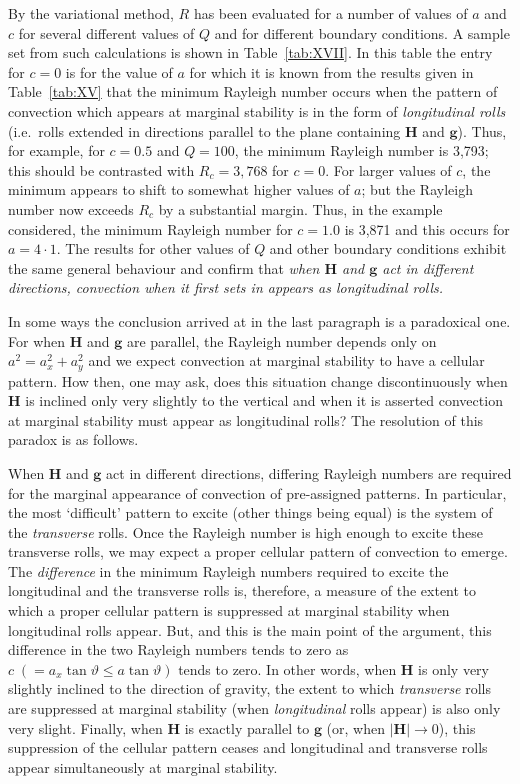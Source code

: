 By the variational method, $R$ has been evaluated for a number of values of $a$ and $c$ for several different values of $Q$ and for different boundary conditions. A sample set from such calculations is shown in Table~\ref{tab:XVII}. In this table the entry for $c=0$ is for the value of $a$ for which it is known from the results given in Table~\ref{tab:XV} that the minimum Rayleigh number occurs when the pattern of convection which appears at marginal stability is in the form of \emph{longitudinal rolls} (i.e.\ rolls extended in directions parallel to the plane containing $\mathbf{H}$ and $\mathbf{g}$). Thus, for example, for $c=0.5$ and $Q=100$, the minimum Rayleigh number is 3,793; this should be contrasted with $R_c=3{,}768$ for $c=0$. For larger values of $c$, the minimum appears to shift to somewhat higher values of $a$; but the Rayleigh number now exceeds $R_c$ by a substantial margin. Thus, in the example considered, the minimum Rayleigh number for $c=1.0$ is 3,871 and this occurs for $a=4{\cdot}1$. The results for other values of $Q$ and other boundary conditions exhibit the same general behaviour and confirm that \emph{when $\mathbf{H}$ and $\mathbf{g}$ act in different directions, convection when it first sets in appears as longitudinal rolls.}

In some ways the conclusion arrived at in the last paragraph is a paradoxical one. For when $\mathbf{H}$ and $\mathbf{g}$ are parallel, the Rayleigh number depends only on $a^2=a_x^2+a_y^2$ and we expect convection at marginal stability to have a cellular pattern. How then, one may ask, does this situation change discontinuously when $\mathbf{H}$ is inclined only very slightly to the vertical and when it is asserted convection at marginal stability must appear as longitudinal rolls? The resolution of this paradox is as follows.

When $\mathbf{H}$ and $\mathbf{g}$ act in different directions, differing Rayleigh numbers are required for the marginal appearance of convection of pre-assigned patterns. In particular, the most `difficult' pattern to excite (other things being equal) is the system of the \emph{transverse} rolls. Once the Rayleigh number is high enough to excite these transverse rolls, we may expect a proper cellular pattern of convection to emerge. The \emph{difference} in the minimum Rayleigh numbers required to excite the longitudinal and the transverse rolls is, therefore, a measure of the extent to which a proper cellular pattern is suppressed at marginal stability when longitudinal rolls appear. But, and this is the main point of the argument, this difference in the two Rayleigh numbers tends to zero as $c\;(=a_x\tan\vartheta\leq a\tan\vartheta)$ tends to zero. In other words, when $\mathbf{H}$ is only very slightly inclined to the direction of gravity, the extent to which \emph{transverse} rolls are suppressed at marginal stability (when \emph{longitudinal} rolls appear) is also only very slight. Finally, when $\mathbf{H}$ is exactly parallel to $\mathbf{g}$ (or, when $|\mathbf{H}|\to 0$), this suppression of the cellular pattern ceases and longitudinal and transverse rolls appear simultaneously at marginal stability.


